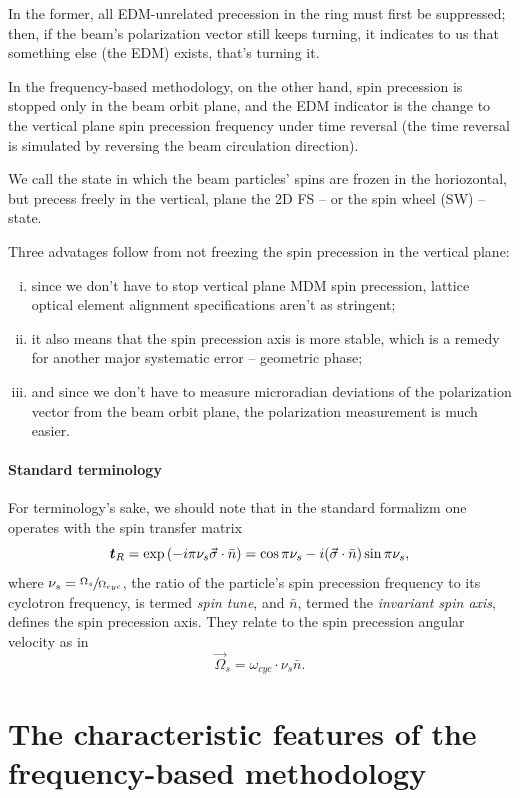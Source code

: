 \documentclass[]{elsarticle}
\newcommand{\w}{\omega}
\newcommand{\W}{\Omega}
\begin{document}
In the former, all EDM-unrelated precession in the ring must first be suppressed; then, if the beam's
polarization vector still keeps turning, it indicates to us that something else (the EDM) exists,
that's turning it.

In the frequency-based methodology, on the other hand, spin precession is stopped only in the beam orbit plane,
and the EDM indicator is the change to the vertical plane spin precession frequency under time reversal
(the time reversal is simulated by reversing the beam circulation direction).

We call the state in which the beam particles' spins are frozen in the horiozontal,
but precess freely in the vertical, plane the 2D FS -- or the spin wheel (SW) -- state.

Three advatages follow from not freezing the spin precession in the vertical plane:
\begin{enumerate}[(i)]
\item since we don't have to stop vertical plane MDM spin precession, lattice optical element alignment
  specifications aren't as stringent;
\item it also means that the spin precession axis is more stable, which is a remedy for another major
  systematic error -- geometric phase;\label{itm:advantages:stability}
\item and since we don't have to measure microradian deviations of the polarization vector from the
  beam orbit plane, the polarization measurement is much easier.
\end{enumerate}

\paragraph{Standard terminology}
For terminology's sake, we should note that in the standard formalizm one operates with
the spin transfer matrix~\cite[p.~4]{COSY:SpinTuneMapping}
\[
\boldsymbol{t}_R = \exp\bkt{-i\pi\nu_s\vec\sigma\cdot\bar n} = \cos\pi\nu_s - i (\vec\sigma\cdot\bar n)\sin\pi\nu_s,
\]
where $\nu_s = \sfrac{\W_s}{\W_{cyc}}$, the ratio of the particle's spin precession frequency to
its cyclotron frequency, is termed \emph{spin tune}, and $\bar n$, termed the \emph{invariant spin axis},
defines the spin precession axis. They relate to the spin precession angular velocity as in
\[
\vec\W_s = \w_{cyc}\cdot \nu_s\bar n.
\]

\section{The characteristic features of the frequency-based methodology}
\end{document}
